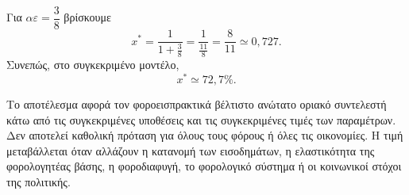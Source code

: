 \begin{alist}
  \item Για $\alpha\varepsilon=\dfrac38$ βρίσκουμε
        \[
          x^*
          =\frac{1}{1+\frac38}
          =\frac{1}{\frac{11}{8}}
          =\frac{8}{11}
          \simeq0{,}727.
        \]
        Συνεπώς, στο συγκεκριμένο μοντέλο,
        \[
          {x^*\simeq72{,}7\%}.
        \]

        Το αποτέλεσμα αφορά τον φοροεισπρακτικά βέλτιστο ανώτατο
        οριακό συντελεστή κάτω από τις συγκεκριμένες υποθέσεις και τις
        συγκεκριμένες τιμές των παραμέτρων. Δεν αποτελεί καθολική
        πρόταση για όλους τους φόρους ή όλες τις οικονομίες. Η τιμή
        μεταβάλλεται όταν αλλάζουν η κατανομή των εισοδημάτων, η
        ελαστικότητα της φορολογητέας βάσης, η φοροδιαφυγή, το
        φορολογικό σύστημα ή οι κοινωνικοί στόχοι της πολιτικής.
\end{alist}
